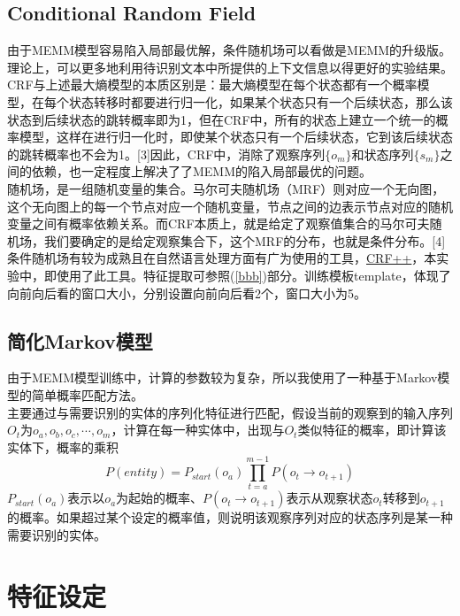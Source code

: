 \documentclass[11pt]{article}
\begin{document}
\subsection{Conditional Random Field}\label{crf}
\hspace{1.6em} 由于MEMM模型容易陷入局部最优解，条件随机场可以看做是MEMM的升级版。理论上，可以更多地利用待识别文本中所提供的上下文信息以得更好的实验结果。CRF与上述最大熵模型的本质区别是：最大熵模型在每个状态都有一个概率模型，在每个状态转移时都要进行归一化，如果某个状态只有一个后续状态，那么该状态到后续状态的跳转概率即为1，但在CRF中，所有的状态上建立一个统一的概率模型，这样在进行归一化时，即使某个状态只有一个后续状态，它到该后续状态的跳转概率也不会为1。[3]因此，CRF中，消除了观察序列$\{o_m\}$和状态序列$\{s_m\}$之间的依赖，也一定程度上解决了了MEMM的陷入局部最优的问题。\\
\indent 随机场，是一组随机变量的集合。马尔可夫随机场（MRF）则对应一个无向图，这个无向图上的每一个节点对应一个随机变量，节点之间的边表示节点对应的随机变量之间有概率依赖关系。而CRF本质上，就是给定了观察值集合的马尔可夫随机场，我们要确定的是给定观察集合下，这个MRF的分布，也就是条件分布。[4]\\
\indent 条件随机场有较为成熟且在自然语言处理方面有广为使用的工具，\href{http://sourceforge.net/projects/crfpp/}{CRF++}，本实验中，即使用了此工具。特征提取可参照(\ref{bbb})部分。训练模板template，体现了向前向后看的窗口大小，分别设置向前向后看2个，窗口大小为5。
\subsection{简化Markov模型}\label{mymodel}
\hspace{1.6em} 由于MEMM模型训练中，计算的参数较为复杂，所以我使用了一种基于Markov模型的简单概率匹配方法。\\
\indent 主要通过与需要识别的实体的序列化特征进行匹配，假设当前的观察到的输入序列$O_t$为$o_a, o_b, o_c, \cdots, o_m$，计算在每一种实体中，出现与$O_t$类似特征的概率，即计算该实体下，概率的乘积
\begin{equation}\label{eq4}
P(entity) = P_{start}(o_a)\prod_{t = a}^{m-1}P(o_t\rightarrow o_{t+1})
\end{equation}
\indent $P_{start}(o_a)$表示以$o_a$为起始的概率、$P(o_t\rightarrow o_{t+1})$表示从观察状态$o_t$转移到$o_{t+1}$的概率。如果超过某个设定的概率值，则说明该观察序列对应的状态序列是某一种需要识别的实体。

\section{特征设定}
\end{document}

